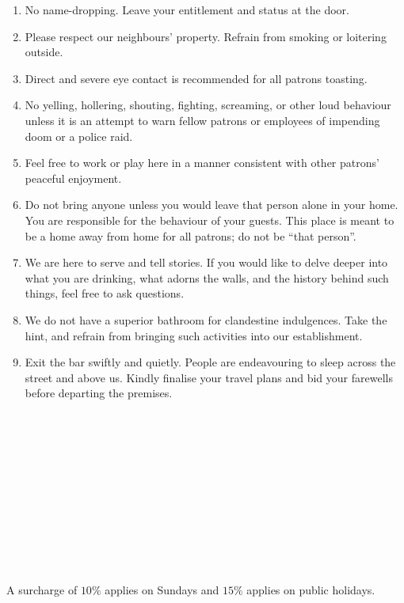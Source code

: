 \documentclass[
    pdflatex,
    fontsize=8pt,
    draft=true,
    twoside
]{article}
\begin{document}
\begin{enumerate}
    \item No name-dropping. Leave your entitlement and status at the door.
    \item Please respect our neighbours' property. Refrain from smoking or loitering outside.
    \item Direct and severe eye contact is recommended for all patrons toasting.
    \item No yelling, hollering, shouting, fighting, screaming, or other loud behaviour unless it is an attempt to warn fellow patrons or employees of impending doom or a police raid.
    \item Feel free to work or play here in a manner consistent with other patrons' peaceful enjoyment.
    \item Do not bring anyone unless you would leave that person alone in your home. You are responsible for the behaviour of your guests. This place is meant to be a home away from home for all patrons; do not be ``that person''.
    \item We are here to serve and tell stories. If you would like to delve deeper into what you are drinking, what adorns the walls, and the history behind such things, feel free to ask questions.
    \item We do not have a superior bathroom for clandestine indulgences. Take the hint, and refrain from bringing such activities into our establishment.
    \item Exit the bar swiftly and quietly. People are endeavouring to sleep across the street and above us. Kindly finalise your travel plans and bid your farewells before departing the premises.
\end{enumerate}
~\\~\\~\\~\\~\\~\\~\\~\\~\\~\\~\\
A surcharge of $10\%$ applies on Sundays and $15\%$ applies on public
holidays.
\end{document}
